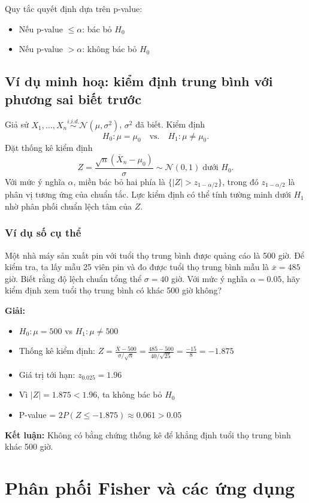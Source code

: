 Quy tắc quyết định dựa trên p-value:
\begin{itemize}
    \item Nếu p-value $\leq \alpha$: bác bỏ $H_0$
    \item Nếu p-value $> \alpha$: không bác bỏ $H_0$
\end{itemize}

\subsection{Ví dụ minh hoạ: kiểm định trung bình với phương sai biết trước}
Giả sử $X_1,\ldots,X_n\overset{i.i.d.}{\sim}\mathcal{N}(\mu,\sigma^2)$, $\sigma^2$ đã biết. Kiểm định
\[
H_0:\mu=\mu_0 \quad \text{vs.}\quad H_1:\mu\ne\mu_0.
\]
Đặt thống kê kiểm định
\[
Z=\frac{\sqrt{n}(\overline{X}_n-\mu_0)}{\sigma} \sim \mathcal{N}(0,1)\;\text{dưới } H_0.
\]
Với mức ý nghĩa $\alpha$, miền bác bỏ hai phía là $\{|Z|>z_{1-\alpha/2}\}$, trong đó $z_{1-\alpha/2}$ là phân vị tương ứng của chuẩn tắc. Lực kiểm định có thể tính tường minh dưới $H_1$ nhờ phân phối chuẩn lệch tâm của $Z$.

\subsubsection*{Ví dụ số cụ thể}
Một nhà máy sản xuất pin với tuổi thọ trung bình được quảng cáo là 500 giờ. Để kiểm tra, ta lấy mẫu 25 viên pin và đo được tuổi thọ trung bình mẫu là $\overline{x} = 485$ giờ. Biết rằng độ lệch chuẩn tổng thể $\sigma = 40$ giờ. Với mức ý nghĩa $\alpha = 0.05$, hãy kiểm định xem tuổi thọ trung bình có khác 500 giờ không?

\textbf{Giải:}
\begin{itemize}
    \item $H_0: \mu = 500$ vs $H_1: \mu \neq 500$
    \item Thống kê kiểm định: $Z = \frac{\overline{X} - 500}{\sigma/\sqrt{n}} = \frac{485 - 500}{40/\sqrt{25}} = \frac{-15}{8} = -1.875$
    \item Giá trị tới hạn: $z_{0.025} = 1.96$
    \item Vì $|Z| = 1.875 < 1.96$, ta không bác bỏ $H_0$
    \item P-value = $2P(Z \leq -1.875) \approx 0.061 > 0.05$
\end{itemize}

\textbf{Kết luận:} Không có bằng chứng thống kê để khẳng định tuổi thọ trung bình khác 500 giờ.

\section{Phân phối Fisher và các ứng dụng}

